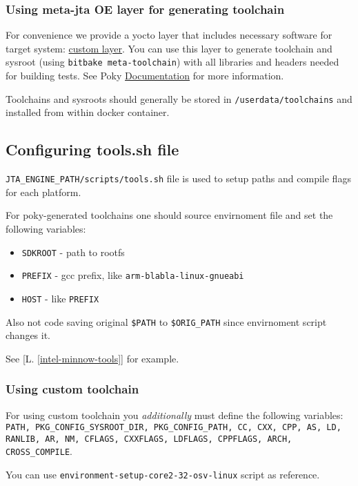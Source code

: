 \subsubsection{Using meta-jta OE layer for generating toolchain}
For convenience we provide a yocto layer that includes necessary software for target system: \href{https://bitbucket.org/cogentembedded/meta-jta/}{custom layer}. You can use this layer to generate toolchain and sysroot (using \texttt{bitbake meta-toolchain}) with all libraries and headers needed for building tests. See Poky \href{http://www.yoctoproject.org/docs/1.6/adt-manual/adt-manual.html}{Documentation} for more information.

Toolchains and sysroots should generally be stored in \texttt{/userdata/toolchains} and installed from within docker container.

\subsection{Configuring tools.sh file}
\texttt{JTA\_ENGINE\_PATH/scripts/tools.sh} file is used to setup paths and compile flags for each platform.

For poky-generated toolchains one should source envirnoment file and set the following variables:
\begin{itemize}
\item \texttt{SDKROOT} - path to rootfs
\item \texttt{PREFIX} - gcc prefix, like \texttt{arm-blabla-linux-gnueabi}
\item \texttt{HOST} - like \texttt{PREFIX}
\end{itemize}

Also not code saving original \texttt{\$PATH} to \texttt{\$ORIG\_PATH} since envirnoment script changes it.

See [L. \ref{intel-minnow-tools}] for example.

\subsubsection{Using custom toolchain}
\label {subsec:custom-toolchain-tools-sh}

For using custom toolchain you \emph{additionally} must define the following variables: \texttt{PATH, PKG\_CONFIG\_SYSROOT\_DIR, PKG\_CONFIG\_PATH, CC, CXX, CPP, AS, LD, RANLIB, AR, NM, CFLAGS, CXXFLAGS, LDFLAGS, CPPFLAGS, ARCH, CROSS\_COMPILE}.

You can use \texttt{environment-setup-core2-32-osv-linux} script as reference.

